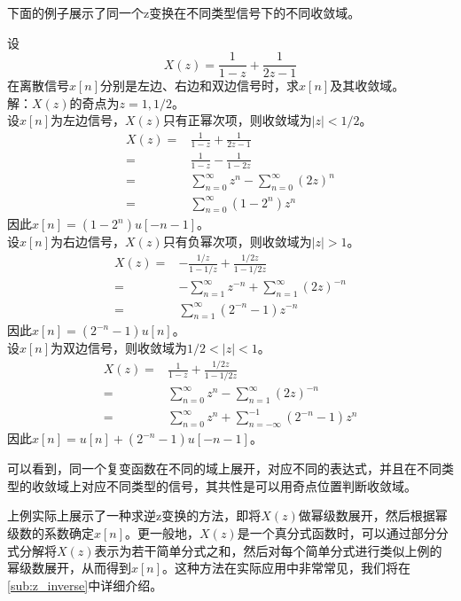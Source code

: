 \documentclass{ctexbook}
\begin{document}
下面的例子展示了同一个z变换在不同类型信号下的不同收敛域。
\begin{example}[收敛域的确定]
    设$$X(z)=\frac{1}{1-z}+\frac{1}{2z-1}$$
    在离散信号$x[n]$分别是左边、右边和双边信号时，求$x[n]$及其收敛域。\\
    解：$X(z)$的奇点为$z=1,1/2$。\\
    设$x[n]$为左边信号，$X(z)$只有正幂次项，则收敛域为$|z|<1/2$。
    \begin{align*}
        X(z)=&\frac{1}{1-z}+\frac{1}{2z-1}\\
        =&\frac{1}{1-z}-\frac{1}{1-2z}\\
        =&\sum_{n=0}^{\infty}z^{n}-\sum_{n=0}^{\infty}\left(2z\right)^{n}\\
        =&\sum_{n=0}^{\infty}\left(1-2^{n}\right)z^{n}
    \end{align*}
    因此$x[n]=(1-2^{n})u[-n-1]$。\\
    设$x[n]$为右边信号，$X(z)$只有负幂次项，则收敛域为$|z|>1$。
    \begin{align*}
        X(z)=&-\frac{1/z}{1-1/z}+\frac{1/2z}{1-1/2z}\\
        =&-\sum_{n=1}^{\infty}z^{-n}+\sum_{n=1}^{\infty}\left(2z\right)^{-n}\\
        =&\sum_{n=1}^{\infty}\left(2^{-n}-1\right)z^{-n}
    \end{align*}
    因此$x[n]=(2^{-n}-1)u[n]$。\\
    设$x[n]$为双边信号，则收敛域为$1/2<|z|<1$。 
    \begin{align*}
        X(z)=&\frac{1}{1-z}+\frac{1/2z}{1-1/2z}\\
        =&\sum_{n=0}^{\infty}z^{n}-\sum_{n=1}^{\infty}\left(2z\right)^{-n}\\
        =&\sum_{n=0}^{\infty}z^{n}+\sum_{n=-\infty}^{-1}\left(2^{-n}-1\right)z^{n}
    \end{align*}
    因此$x[n]=u[n]+(2^{-n}-1)u[-n-1]$。
\end{example}
可以看到，同一个复变函数在不同的域上展开，对应不同的表达式，并且在不同类型的收敛域上对应不同类型的信号，其共性是可以用奇点位置判断收敛域。

上例实际上展示了一种求逆z变换的方法，即将$X(z)$做幂级数展开，然后根据幂级数的系数确定$x[n]$。更一般地，$X(z)$是一个真分式函数时，可以通过部分分式分解将$X(z)$表示为若干简单分式之和，然后对每个简单分式进行类似上例的幂级数展开，从而得到$x[n]$。这种方法在实际应用中非常常见，我们将在\ref{sub:z_inverse}中详细介绍。
\end{document}
